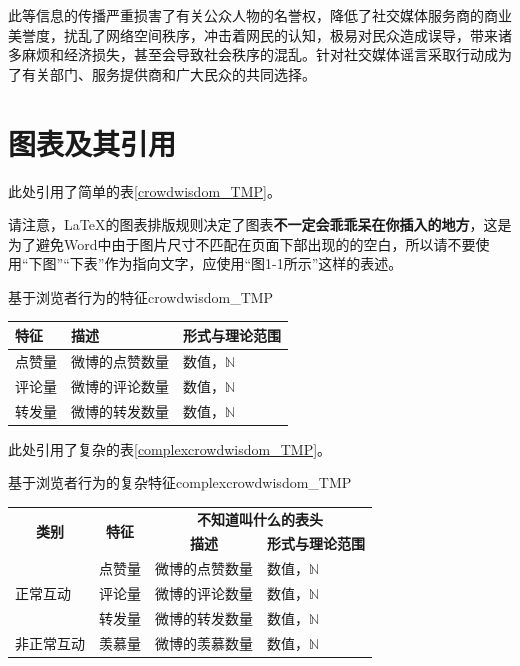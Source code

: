 \documentclass[a4paper,AutoFakeBold,oneside,12pt]{book}
\begin{document}
此等信息的传播严重损害了有关公众人物的名誉权，降低了社交媒体服务商的商业美誉度，扰乱了网络空间秩序，冲击着网民的认知，极易对民众造成误导，带来诸多麻烦和经济损失，甚至会导致社会秩序的混乱。针对社交媒体谣言采取行动成为了有关部门、服务提供商和广大民众的共同选择。\cite{周兴2017基于深度学习的谣言检测及模式挖掘}

\section{图表及其引用}
此处引用了简单的表\ref{crowdwisdom_TMP}。

请注意，\LaTeX{}的图表排版规则决定了图表\textbf{不一定会乖乖呆在你插入的地方}，这是为了避免Word中由于图片尺寸不匹配在页面下部出现的的空白，所以请不要使用“下图”“下表”作为指向文字，应使用“图1-1所示”这样的表述。

\begin{bupttable}{基于浏览者行为的特征}{crowdwisdom_TMP}

    \begin{tabular}{l|l|l}
		\hline \textbf{特征} & \textbf{描述} & \textbf{形式与理论范围}\\
		\hline 点赞量 & 微博的点赞数量 & 数值，$\mathbb{N}$ \\
		\hline 评论量 & 微博的评论数量 & 数值，$\mathbb{N}$ \\
		\hline 转发量 & 微博的转发数量 & 数值，$\mathbb{N}$ \\
		\hline
    \end{tabular}
\end{bupttable}

此处引用了复杂的表\ref{complexcrowdwisdom_TMP}。


\begin{bupttable}{基于浏览者行为的复杂特征}{complexcrowdwisdom_TMP}
    \begin{tabular}{l|l|l|l}
        \hline
        \multicolumn{1}{c|}{\multirow{2}{*}{\textbf{类别}}} & \multicolumn{1}{c|}{\multirow{2}{*}{\textbf{特征}}} & \multicolumn{2}{c}{\textbf{不知道叫什么的表头}} \\
        \cline{3-4}
        & & \multicolumn{1}{c|}{\textbf{描述}} & \multicolumn{1}{c}{\textbf{形式与理论范围}} \\
        \hline
        \multirow{3}{*}{正常互动} & 点赞量 & 微博的点赞数量 & 数值，$\mathbb{N}$ \\
        \cline{2-4}
        & 评论量 & 微博的评论数量 & 数值，$\mathbb{N}$ \\
        \cline{2-4}
        & 转发量 & 微博的转发数量 & 数值，$\mathbb{N}$ \\
        \hline
        非正常互动 & 羡慕量 & 微博的羡慕数量 & 数值，$\mathbb{N}$ \\
        \hline
    \end{tabular}
\end{bupttable}
\end{document}
